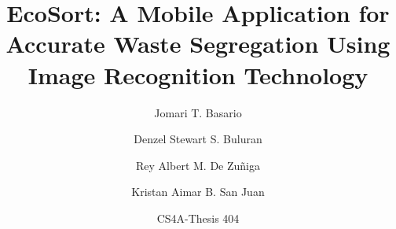\documentclass[english,12pt,letterpaper]{article}
\title{EcoSort: A Mobile Application for Accurate Waste Segregation Using Image Recognition Technology}
\author{
	Jomari T. Basario \and 
	Denzel Stewart S. Buluran \and 
	Rey Albert M. De Zuñiga \and
	Kristan Aimar B. San Juan
}
\date{CS4A-Thesis 404}
\begin{document}
	\maketitle
	
	
	
	
	
	
	
	\nocite{recycleguide2024}
	\printbibliography
\end{document}
